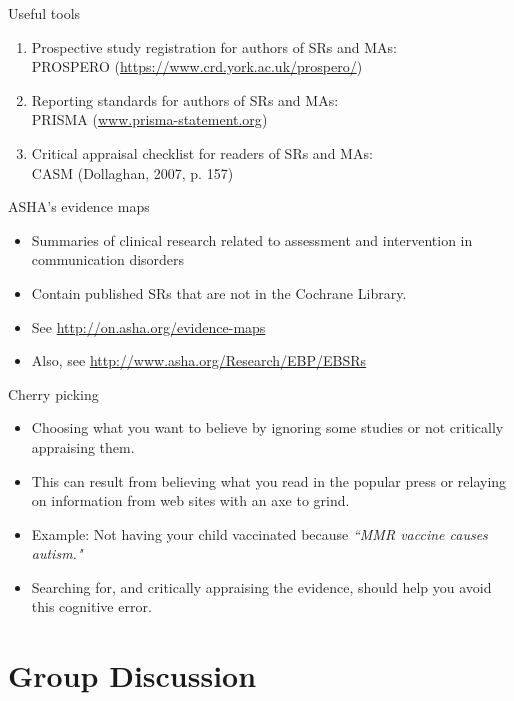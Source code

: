\documentclass{beamer}
\begin{document}
% 
\begin{frame}{Useful tools}
	\begin{enumerate}
	\item Prospective study registration for authors of SRs and MAs: \\ \alert{PROSPERO} (\url{https://www.crd.york.ac.uk/prospero/})
	\item Reporting standards for authors of SRs and MAs: \\ \alert{PRISMA} (\url{www.prisma-statement.org})
	\item Critical appraisal checklist for readers of SRs and MAs: \\ \alert{CASM} (Dollaghan, 2007, p. 157)
	\end{enumerate}
\end{frame}

% 
\begin{frame}{ASHA's evidence maps}
	\begin{itemize}
	\item Summaries of clinical research related to assessment and intervention in communication disorders
	\item Contain published SRs that are not in the Cochrane Library. 
	\item See \url{http://on.asha.org/evidence-maps}
	\item Also, see \url{http://www.asha.org/Research/EBP/EBSRs}
	\end{itemize}
\end{frame}

% 
\begin{frame}{\alert{Cherry picking}}
	\begin{itemize}
	\item Choosing what you want to believe by ignoring some studies or not critically appraising them.
	\item This can result from believing what you read in the popular press or relaying on information from web sites with an axe to grind.
	\item Example: Not having your child vaccinated because \emph{``MMR vaccine causes autism."} 
	\item Searching for, and critically appraising the evidence, should help you avoid this cognitive error. 
	\end{itemize}
\end{frame}

\section*{Group Discussion}
\end{document}
